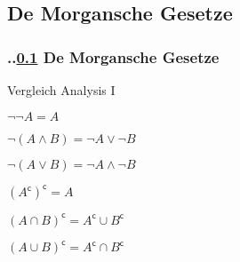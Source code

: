 \def\stitle{De Morgansche Gesetze}
\subsection{\stitle}\label{S:Morgansche}
\begin{frame}[fragile]%
  \frametitle{\kap..\ref{S:Morgansche} \stitle}%
Vergleich Analysis I
\medskip

\begin{description}
  \item[und bzw. oder]
  \item $\neg \neg A = A$
  \item $\neg (A \wedge B) = \neg A \vee \neg B$
  \item $\neg (A \vee B) = \neg A \wedge \neg B$
\end{description}
\medskip

\begin{description}
  \item[Schnittmenge bzw. Vereinigung]
  \item $(A^{\mathsf{c}})^{\mathsf{c}} = A$
  \item $(A \cap B)^{\mathsf{c}} = A^{\mathsf{c}} \cup B^{\mathsf{c}}$
  \item $(A \cup B)^{\mathsf{c}} = A^{\mathsf{c}} \cap B^{\mathsf{c}}$
\end{description}

\end{frame}
